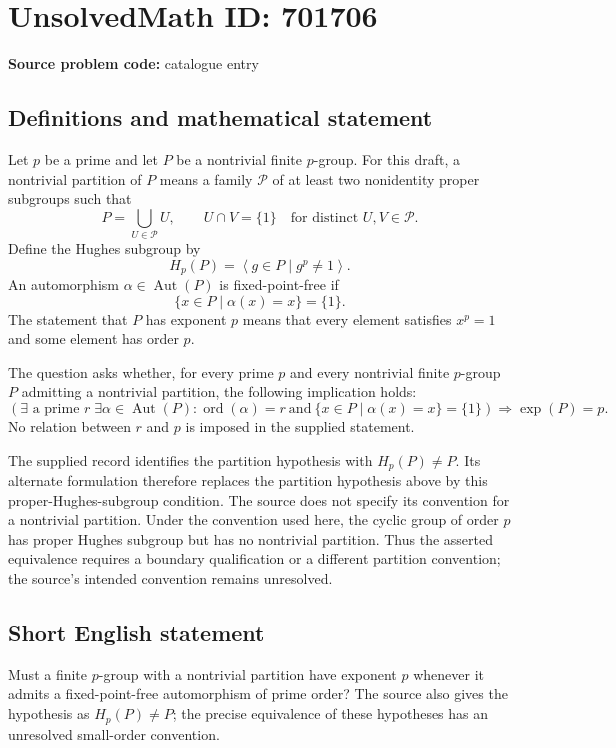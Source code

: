 \documentclass[11pt]{article}
\begin{document}
\section*{UnsolvedMath ID: 701706}
\textbf{Source problem code:} catalogue entry
\subsection{Definitions and mathematical statement}
Let \(p\) be a prime and let \(P\) be a nontrivial finite \(p\)-group. For this draft, a nontrivial partition of \(P\) means a family \(\mathcal P\) of at least two nonidentity proper subgroups such that
\[
P=\bigcup_{U\in\mathcal P}U,
\qquad U\cap V=\{1\}\quad\text{for distinct }U,V\in\mathcal P.
\]
Define the Hughes subgroup by
\[
H_p(P)=\left\langle g\in P\mid g^p\ne 1\right\rangle.
\]
An automorphism \(\alpha\in\operatorname{Aut}(P)\) is fixed-point-free if
\[
\{x\in P\mid \alpha(x)=x\}=\{1\}.
\]
The statement that \(P\) has exponent \(p\) means that every element satisfies \(x^p=1\) and some element has order \(p\).

The question asks whether, for every prime \(p\) and every nontrivial finite \(p\)-group \(P\) admitting a nontrivial partition, the following implication holds:
\[
\left(\exists\text{ a prime }r\;\exists\alpha\in\operatorname{Aut}(P):
\operatorname{ord}(\alpha)=r
\ \text{and}\ \{x\in P\mid\alpha(x)=x\}=\{1\}\right)
\Longrightarrow \operatorname{exp}(P)=p.
\]
No relation between \(r\) and \(p\) is imposed in the supplied statement.

The supplied record identifies the partition hypothesis with \(H_p(P)\ne P\). Its alternate formulation therefore replaces the partition hypothesis above by this proper-Hughes-subgroup condition. The source does not specify its convention for a nontrivial partition. Under the convention used here, the cyclic group of order \(p\) has proper Hughes subgroup but has no nontrivial partition. Thus the asserted equivalence requires a boundary qualification or a different partition convention; the source's intended convention remains unresolved.
\subsection{Short English statement}
Must a finite \(p\)-group with a nontrivial partition have exponent \(p\) whenever it admits a fixed-point-free automorphism of prime order? The source also gives the hypothesis as \(H_p(P)\ne P\); the precise equivalence of these hypotheses has an unresolved small-order convention.
\end{document}
